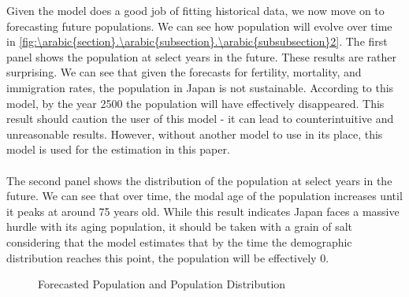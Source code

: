 \documentclass[10pt]{article}
\renewcommand{\thesection}{\arabic{section}}
\renewcommand{\thesubsection}{\thesection.\arabic{subsection}}
\renewcommand{\thesubsubsection}{\thesubsection.\arabic{subsubsection}}
\numberwithin{equation}{subsection}
\renewcommand{\subsection}[2][]{\oldsubsection[#1]{#2}\index{#1}\label{sec:\thesubsection}}
\newcommand*{\FigureDir}{../../graphs}
\begin{document}
\begin{appendices}
\noindent
Given the model does a good job of fitting historical data, we now move on to forecasting future populations. We can see how population will evolve over time in \autoref{fig:\thesubsubsection2}. The first panel shows the population at select years in the future. These results are rather surprising. We can see that given the forecasts for fertility, mortality, and immigration rates, the population in Japan is not sustainable. According to this model, by the year 2500 the population will have effectively disappeared. This result should caution the user of this model - it can lead to counterintuitive and unreasonable results. However, without another model to use in its place, this model is used for the estimation in this paper.
\\\\
The second panel shows the distribution of the population at select years in the future. We can see that over time, the modal age of the population increases until it peaks at around 75 years old. While this result indicates Japan faces a massive hurdle with its aging population, it should be taken with a grain of salt considering that the model estimates that by the time the demographic distribution reaches this point, the population will be effectively 0.

\begin{figure}[H]
   \centering
   \caption{\label{fig:\thesubsubsection2}Forecasted Population and Population Distribution}
\end{figure}



\end{appendices}
\end{document}

